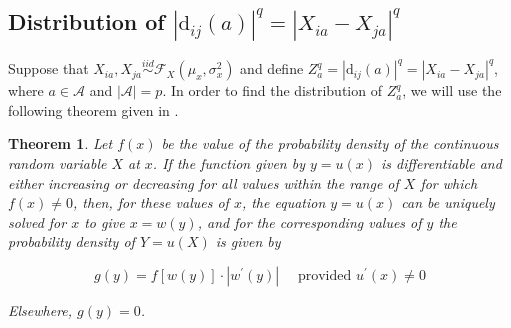 \documentclass[10pt,letterpaper]{article}
\newtheorem{theorem}{Theorem}[section]
\begin{document}
\subsection{Distribution of \texorpdfstring{$|\text{d}_{ij}(a)|^q = |X_{ia} - X_{ja}|^q$}{}}

Suppose that $X_{ia}, X_{ja} \overset{iid}{\sim} \mathcal{F}_X(\mu_x,\sigma^2_x)$ and define $Z^q_a = |\text{d}_{ij}(a)|^q = |X_{ia} - X_{ja}|^q$, where $a \in \mathcal{A}$ and $|\mathcal{A}| = p$. In order to find the distribution of $Z^q_a$, we will use the following theorem given in \cite{freund2004}.

\begin{theorem}\label{thm:freund}
	Let $f(x)$ be the value of the probability density of the continuous random variable $X$ at $x$. If the function given by $y = u(x)$ is differentiable and either increasing or decreasing for all values within the range of $X$ for which $f(x) \neq 0$, then, for these values of $x$, the equation $y = u(x)$ can be uniquely solved for $x$ to give $x = w(y)$, and for the corresponding values of $y$ the probability density of $Y = u(X)$ is given by
	
	\[g(y) = f[w(y)] \cdot |w^\prime(y)| \quad \text{ provided } u^\prime(x) \neq 0\]
	
	\noindent Elsewhere, $g(y) = 0$.
\end{theorem}
\end{document}
